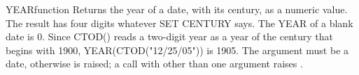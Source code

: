 \begin{XbaseEntry}{YEAR}{function}
Returns the year of a date, with its century, as a numeric value.
\Syntax
{}
\Usage
The result has four digits whatever SET CENTURY says. The YEAR of a blank date is 0. Since CTOD() reads a two-digit year as a year of the century that begins with 1900, YEAR(CTOD("12/25/05")) is 1905. The argument must be a date, otherwise  is raised; a call with other than one argument raises .
\Examples
{}
\end{XbaseEntry}
